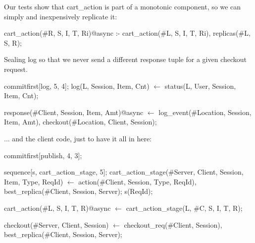 Our tests show that cart\_action is part of a monotonic component, so we can simply and inexpensively replicate it:

\begin{Dedalus}
cart_action(#R, S, I, T, Ri)@async :-
    cart_action(#L, S, I, T, Ri),
    replicas(#L, S, R);
\end{Dedalus}

Sealing log so that we never send a different response tuple for a given checkout request. 

\begin{Dedalus}
commitfirst[log, 5, 4];
log(L, Session, Item, Cnt) \(\leftarrow\) 
    status(L, User, Session, Item, Cnt);

response(#Client, Session, Item, Amt)@async \(\leftarrow\)
    log_event(#Location, Session, Item, Amt),
    checkout(#Location, Client, Session);
\end{Dedalus}


... and the client code, just to have it all in here:

\begin{Dedalus}
commitfirst[publish, 4, 3];

sequence[s, cart_action_stage, 5];
cart_action_stage(#Server, Client, Session, Item, Type, ReqId) \(\leftarrow\)
    action(#Client, Session, Type, ReqId),
    best_replica(#Client, Session, Server);
    s(ReqId);

cart_action(#L, S, I, T, R)@async \(\leftarrow\) 
    cart_action_stage(L, #C, S, I, T, R);

checkout(#Server, Client, Session) \(\leftarrow\)
    checkout_req(#Client, Session),
    best_replica(#Client, Session, Server);
\end{Dedalus}
